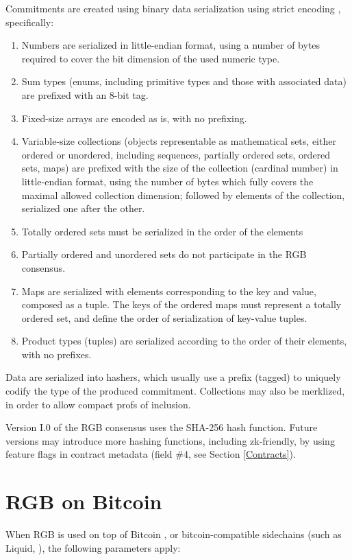\documentclass[9pt,oneside]{amsart}
\begin{document}
\begin{multicols}{2}
Commitments are created using binary data serialization using strict encoding \cite{strict},
specifically:
\begin{enumerate}
\item Numbers are serialized in little-endian format,
   using a number of bytes required to cover the bit dimension of the used numeric type.
\item Sum types (enums, including primitive types and those with associated data)
   are prefixed with an 8-bit tag.
\item Fixed-size arrays are encoded as is, with no prefixing.
\item Variable-size collections (objects representable as mathematical sets,
   either ordered or unordered, including sequences, partially ordered sets, ordered sets, maps)
   are prefixed with the size of the collection (cardinal number) in little-endian format,
   using the number of bytes which fully covers the maximal allowed collection dimension;
   followed by elements of the collection, serialized one after the other.
\item Totally ordered sets must be serialized in the order of the elements
\item Partially ordered and unordered sets do not participate in the RGB consensus.
\item Maps are serialized with elements corresponding to the key and value, composed as a tuple.
   The keys of the ordered maps must represent a totally ordered set,
   and define the order of serialization of key-value tuples.
\item Product types (tuples) are serialized according to the order of their elements,
   with no prefixes.
\end{enumerate}

Data are serialized into hashers,
which usually use a prefix (tagged) to uniquely codify the type of the produced commitment.
Collections may also be merklized, in order to allow compact profs of inclusion.

Version I.0 of the RGB consensus uses the SHA-256 hash function.
Future versions may introduce more hashing functions, including zk-friendly,
by using feature flags in contract metadata (field \#4, see Section \ref{Contracts}).


\section{RGB on Bitcoin}

When RGB is used on top of Bitcoin \cite{Bitcoin},
or bitcoin-compatible sidechains (such as Liquid, \cite{Liquid}),
the following parameters apply:


\end{multicols}
\end{document}
